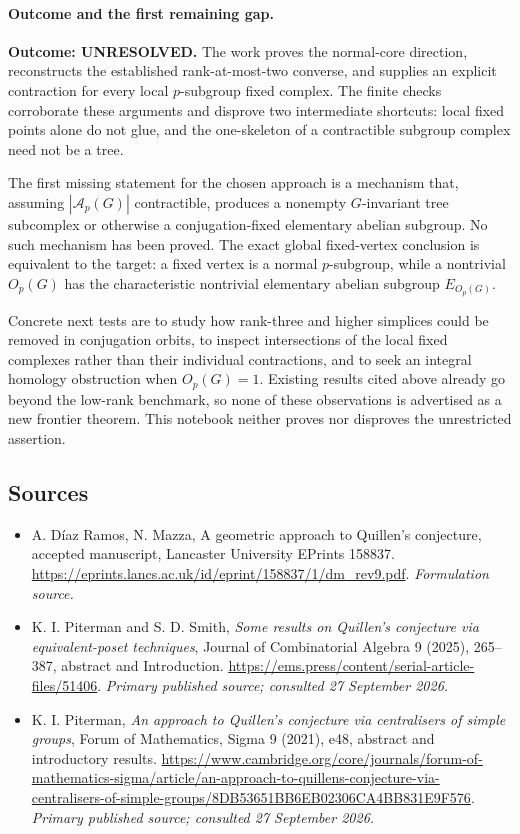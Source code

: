 \documentclass[11pt]{article}
\begin{document}
\paragraph{Outcome and the first remaining gap.}
\textbf{Outcome: UNRESOLVED.} The work proves the normal-core direction,
reconstructs the established rank-at-most-two converse, and supplies an
explicit contraction for every local $p$-subgroup fixed complex. The
finite checks corroborate these arguments and disprove two intermediate
shortcuts: local fixed points alone do not glue, and the one-skeleton of
a contractible subgroup complex need not be a tree.

The first missing statement for the chosen approach is a mechanism that,
assuming $|\mathcal A_p(G)|$ contractible, produces a nonempty
$G$-invariant tree subcomplex or otherwise a conjugation-fixed elementary
abelian subgroup. No such mechanism has been proved. The exact global
fixed-vertex conclusion is equivalent to the target: a fixed vertex is a
normal $p$-subgroup, while a nontrivial $O_p(G)$ has the characteristic
nontrivial elementary abelian subgroup $E_{O_p(G)}$.

Concrete next tests are to study how rank-three and higher simplices could
be removed in conjugation orbits, to inspect intersections of the local
fixed complexes rather than their individual contractions, and to seek an
integral homology obstruction when $O_p(G)=1$. Existing results cited above
already go beyond the low-rank benchmark, so none of these observations
is advertised as a new frontier theorem. This notebook neither proves nor
disproves the unrestricted assertion.

\subsection{Sources}
\begin{itemize}
\item[S1]A. Díaz Ramos, N. Mazza, A geometric approach to Quillen's conjecture, accepted manuscript, Lancaster University EPrints 158837.
\url{https://eprints.lancs.ac.uk/id/eprint/158837/1/dm_rev9.pdf}.
\textit{Formulation source.}
\item[E1] K. I. Piterman and S. D. Smith,
\emph{Some results on Quillen's conjecture via equivalent-poset techniques},
Journal of Combinatorial Algebra 9 (2025), 265--387, abstract and Introduction.
\url{https://ems.press/content/serial-article-files/51406}.
\textit{Primary published source; consulted 27 September 2026.}
\item[E2] K. I. Piterman,
\emph{An approach to Quillen's conjecture via centralisers of simple groups},
Forum of Mathematics, Sigma 9 (2021), e48, abstract and introductory results.
\url{https://www.cambridge.org/core/journals/forum-of-mathematics-sigma/article/an-approach-to-quillens-conjecture-via-centralisers-of-simple-groups/8DB53651BB6EB02306CA4BB831E9F576}.
\textit{Primary published source; consulted 27 September 2026.}
\end{itemize}
\end{document}
